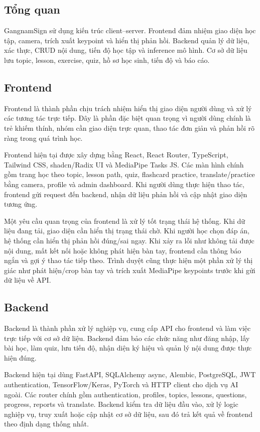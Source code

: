 \documentclass[conference]{IEEEtran}
\begin{document}
\subsection{Tổng quan}
GangnamSign sử dụng kiến trúc client--server. Frontend đảm nhiệm giao diện học tập, camera, trích xuất keypoint và hiển thị phản hồi. Backend quản lý dữ liệu, xác thực, CRUD nội dung, tiến độ học tập và inference mô hình. Cơ sở dữ liệu lưu topic, lesson, exercise, quiz, hồ sơ học sinh, tiến độ và báo cáo.

\subsection{Frontend}
Frontend là thành phần chịu trách nhiệm hiển thị giao diện người dùng và xử lý các tương tác trực tiếp. Đây là phần đặc biệt quan trọng vì người dùng chính là trẻ khiếm thính, nhóm cần giao diện trực quan, thao tác đơn giản và phản hồi rõ ràng trong quá trình học.

Frontend hiện tại được xây dựng bằng React, React Router, TypeScript, Tailwind CSS, shadcn/Radix UI và MediaPipe Tasks JS. Các màn hình chính gồm trang học theo topic, lesson path, quiz, flashcard practice, translate/practice bằng camera, profile và admin dashboard. Khi người dùng thực hiện thao tác, frontend gửi request đến backend, nhận dữ liệu phản hồi và cập nhật giao diện tương ứng.

Một yêu cầu quan trọng của frontend là xử lý tốt trạng thái hệ thống. Khi dữ liệu đang tải, giao diện cần hiển thị trạng thái chờ. Khi người học chọn đáp án, hệ thống cần hiển thị phản hồi đúng/sai ngay. Khi xảy ra lỗi như không tải được nội dung, mất kết nối hoặc không phát hiện bàn tay, frontend cần thông báo ngắn và gợi ý thao tác tiếp theo. Trình duyệt cũng thực hiện một phần xử lý thị giác như phát hiện/crop bàn tay và trích xuất MediaPipe keypoints trước khi gửi dữ liệu về API.

\subsection{Backend}
Backend là thành phần xử lý nghiệp vụ, cung cấp API cho frontend và làm việc trực tiếp với cơ sở dữ liệu. Backend đảm bảo các chức năng như đăng nhập, lấy bài học, làm quiz, lưu tiến độ, nhận diện ký hiệu và quản lý nội dung được thực hiện đúng.

Backend hiện tại dùng FastAPI, SQLAlchemy async, Alembic, PostgreSQL, JWT authentication, TensorFlow/Keras, PyTorch và HTTP client cho dịch vụ AI ngoài. Các router chính gồm authentication, profiles, topics, lessons, questions, progress, reports và translate. Backend kiểm tra dữ liệu đầu vào, xử lý logic nghiệp vụ, truy xuất hoặc cập nhật cơ sở dữ liệu, sau đó trả kết quả về frontend theo định dạng thống nhất.
\end{document}
